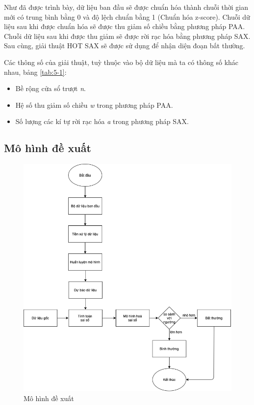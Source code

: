Như đã được trình bày, dữ liệu ban đầu sẽ được chuẩn hóa thành chuỗi thời gian mới có trung bình bằng 0 và độ lệch chuẩn bằng 1 (Chuẩn hóa z-score). Chuỗi dữ liệu sau khi được chuẩn hóa sẽ được thu giảm số chiều bằng phương pháp PAA. Chuỗi dữ liệu sau khi được thu giảm sẽ được rời rạc hóa bằng phương pháp SAX. Sau cùng, giải thuật HOT SAX sẽ được sử dụng để nhận diện đoạn bất thường.

Các thông số của giải thuật, tuỳ thuộc vào bộ dữ liệu mà ta có thông số khác nhau, bảng \ref{tab:5-1}:
\begin{itemize}
\item Bề rộng cửa sổ trượt \textit{n}.
\item Hệ số thu giảm số chiều \textit{w} trong phương pháp PAA.
\item Số lượng các kí tự rời rạc hóa \textit{a} trong phương pháp SAX.
\end{itemize}

\subsection{Mô hình đề xuất}
\begin{figure}[H]
    \centering
    \includegraphics[scale=1.25]{./content/images/5-2.png}
    \caption{Mô hình đề xuất}
    \label{fig:5-2}
\end{figure}

